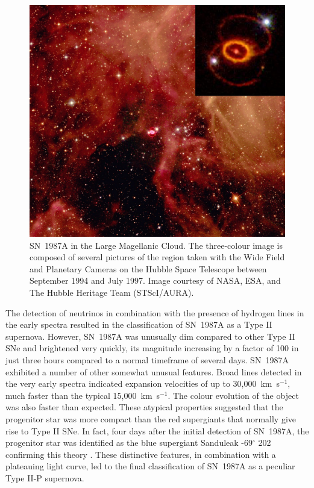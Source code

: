 \begin{figure}
\centering
\includegraphics[clip=true,scale=0.4,trim= 20 80 20 40]{chapters/chapter5/images/87A_image.jpg}
\caption{SN~1987A in the Large Magellanic Cloud.  The three-colour image is composed of several pictures of the region taken with the Wide Field and Planetary Cameras on the Hubble Space Telescope between September 1994 and July 1997.  Image courtesy of NASA, ESA, and The Hubble Heritage Team (STScI/AURA).}
\label{87A_img}
\end{figure}

The detection of neutrinos in combination with the presence of hydrogen lines in the early spectra resulted in the classification of SN~1987A as a Type II supernova.  However, SN~1987A was unusually dim compared to other Type II SNe and brightened very quickly, its magnitude increasing by a factor of 100 in just three hours compared to a normal timeframe of several days.  SN~1987A exhibited a number of other somewhat unusual features. Broad lines detected in the very early spectra indicated expansion velocities of up to 30,000~km~s$^{-1}$, much faster than the typical 15,000~km~s$^{-1}$. The colour evolution of the object was also faster than  expected.  These atypical properties suggested that the progenitor star was more compact than the red supergiants that normally give rise to Type II SNe.  In fact, four days after the initial detection of SN~1987A, the progenitor star was identified as the blue supergiant Sanduleak -69$^{\circ}$ 202  confirming this theory \citep{Sonneborn1987}.  These distinctive features, in combination with a plateauing light curve, led to the final classification of SN~1987A as a peculiar Type II-P supernova. 


